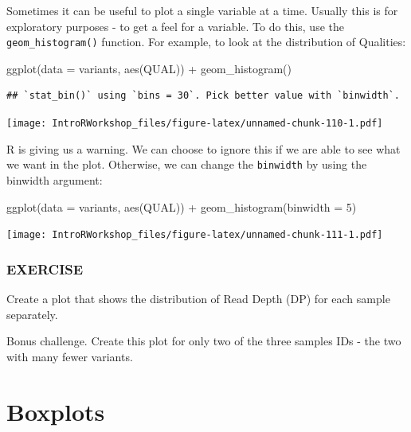 \documentclass[
]{book}
\newenvironment{Shaded}{\begin{snugshade}}{\end{snugshade}}
\newcommand{\AttributeTok}[1]{\textcolor[rgb]{0.77,0.63,0.00}{#1}}
\newcommand{\DecValTok}[1]{\textcolor[rgb]{0.00,0.00,0.81}{#1}}
\newcommand{\FunctionTok}[1]{\textcolor[rgb]{0.00,0.00,0.00}{#1}}
\newcommand{\NormalTok}[1]{#1}
\newcommand{\SpecialCharTok}[1]{\textcolor[rgb]{0.00,0.00,0.00}{#1}}
\begin{document}
Sometimes it can be useful to plot a single variable at a time. Usually this is for exploratory purposes - to get a feel for a variable. To do this, use the \texttt{geom\_histogram()} function. For example, to look at the distribution of Qualities:

\begin{Shaded}
\begin{Highlighting}[]
\FunctionTok{ggplot}\NormalTok{(}\AttributeTok{data =}\NormalTok{ variants, }\FunctionTok{aes}\NormalTok{(QUAL)) }\SpecialCharTok{+}
  \FunctionTok{geom\_histogram}\NormalTok{()}
\end{Highlighting}
\end{Shaded}

\begin{verbatim}
## `stat_bin()` using `bins = 30`. Pick better value with `binwidth`.
\end{verbatim}

\texttt{[image: IntroRWorkshop\_files/figure-latex/unnamed-chunk-110-1.pdf]}

R is giving us a warning. We can choose to ignore this if we are able to see what we want in the plot. Otherwise, we can change the \texttt{binwidth} by using the binwidth argument:

\begin{Shaded}
\begin{Highlighting}[]
\FunctionTok{ggplot}\NormalTok{(}\AttributeTok{data =}\NormalTok{ variants, }\FunctionTok{aes}\NormalTok{(QUAL)) }\SpecialCharTok{+}
  \FunctionTok{geom\_histogram}\NormalTok{(}\AttributeTok{binwidth =} \DecValTok{5}\NormalTok{)}
\end{Highlighting}
\end{Shaded}

\texttt{[image: IntroRWorkshop\_files/figure-latex/unnamed-chunk-111-1.pdf]}

\hypertarget{exercise-6}{%
\subsubsection*{EXERCISE}\label{exercise-6}}

Create a plot that shows the distribution of Read Depth (DP) for each sample separately.

Bonus challenge. Create this plot for only two of the three samples IDs - the two with many fewer variants.

\hypertarget{boxplots}{%
\section{Boxplots}\label{boxplots}}
\end{document}

